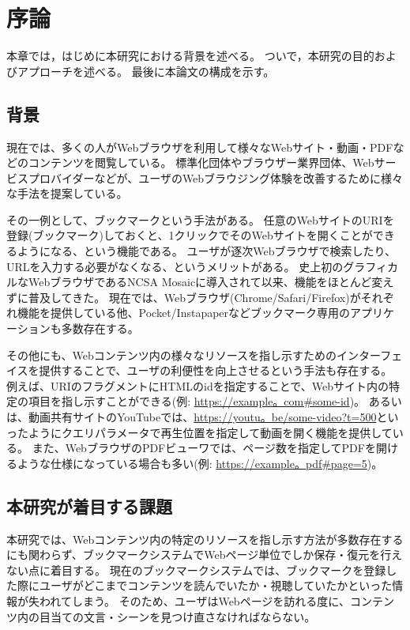 \chapter{序論}
\label{chap:introduction}

本章では，はじめに本研究における背景を述べる。
ついで，本研究の目的およびアプローチを述べる。
最後に本論文の構成を示す。

\section{背景}
\label{section:background}

現在では、多くの人がWebブラウザを利用して様々なWebサイト・動画・PDFなどのコンテンツを閲覧している。
標準化団体やブラウザー業界団体、Webサービスプロバイダーなどが、ユーザのWebブラウジング体験を改善するために様々な手法を提案している。

その一例として、ブックマークという手法がある。
任意のWebサイトのURIを登録(ブックマーク)しておくと、1クリックでそのWebサイトを開くことができるようになる、という機能である。
ユーザが逐次Webブラウザで検索したり、URLを入力する必要がなくなる、というメリットがある。
史上初のグラフィカルなWebブラウザであるNCSA Mosaic\cite{ncsa-mosaic}に導入されて以来、機能をほとんど変えずに普及してきた。
現在では、Webブラウザ(Chrome\cite{chrome}/Safari\cite{safari}/Firefox\cite{firefox})がそれぞれ機能を提供している他、Pocket\cite{pocket}/Instapaper\cite{instapaper}などブックマーク専用のアプリケーションも多数存在する。

その他にも、Webコンテンツ内の様々なリソースを指し示すためのインターフェイスを提供することで、ユーザの利便性を向上させるという手法も存在する。
例えば、URIのフラグメントにHTMLのidを指定することで、Webサイト内の特定の項目を指し示すことができる(例: \url{https://example。com#some-id})。
あるいは、動画共有サイトのYouTube\cite{youtube}では、\url{https://youtu。be/some-video?t=500}といったようにクエリパラメータで再生位置を指定して動画を開く機能を提供している。
また、WebブラウザのPDFビューワでは、ページ数を指定してPDFを開けるような仕様になっている場合も多い\cite{browser-pdf-viewer-pdf-page-num-function}(例: \url{https://example。pdf#page=5})。

\section{本研究が着目する課題}
本研究では、Webコンテンツ内の特定のリソースを指し示す方法が多数存在するにも関わらず、ブックマークシステムでWebページ単位でしか保存・復元を行えない点に着目する。
現在のブックマークシステムでは、ブックマークを登録した際にユーザがどこまでコンテンツを読んでいたか・視聴していたかといった情報が失われてしまう。
そのため、ユーザはWebページを訪れる度に、コンテンツ内の目当ての文言・シーンを見つけ直さなければならない。

